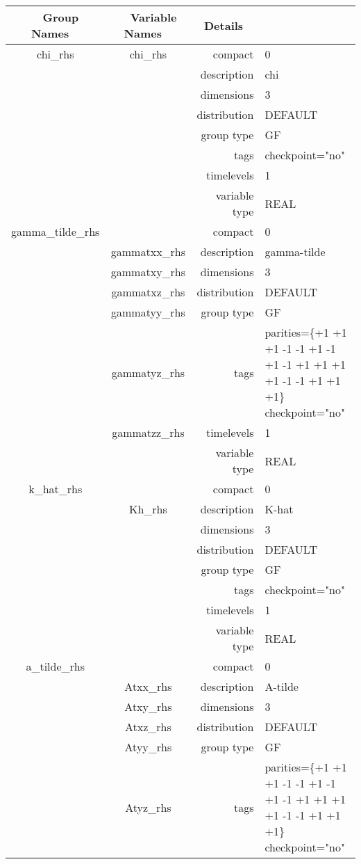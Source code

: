 \begin{tabular*}{150mm}{|c|c@{\extracolsep{\fill}}|rl|} \hline 
~ {\bf Group Names} ~ & ~ {\bf Variable Names} ~  &{\bf Details} ~ & ~ \\ 
\hline 
chi\_rhs & chi\_rhs & compact & 0 \\ 
 &  & description & chi \\ 
 &  & dimensions & 3 \\ 
 &  & distribution & DEFAULT \\ 
 &  & group type & GF \\ 
 &  & tags & checkpoint="no" \\ 
 &  & timelevels & 1 \\ 
 &  & variable type & REAL \\ 
\hline 
gamma\_tilde\_rhs &  & compact & 0 \\ 
 & gammatxx\_rhs & description & gamma-tilde \\ 
 & gammatxy\_rhs & dimensions & 3 \\ 
 & gammatxz\_rhs & distribution & DEFAULT \\ 
 & gammatyy\_rhs & group type & GF \\ 
 & gammatyz\_rhs & tags & parities=\{+1 +1 +1   -1 -1 +1   -1 +1 -1   +1 +1 +1   +1 -1 -1   +1 +1 +1\} checkpoint="no" \\ 
 & gammatzz\_rhs & timelevels & 1 \\ 
 &  & variable type & REAL \\ 
\hline 
k\_hat\_rhs &  & compact & 0 \\ 
 & Kh\_rhs & description & K-hat \\ 
 &  & dimensions & 3 \\ 
 &  & distribution & DEFAULT \\ 
 &  & group type & GF \\ 
 &  & tags & checkpoint="no" \\ 
 &  & timelevels & 1 \\ 
 &  & variable type & REAL \\ 
\hline 
a\_tilde\_rhs &  & compact & 0 \\ 
 & Atxx\_rhs & description & A-tilde \\ 
 & Atxy\_rhs & dimensions & 3 \\ 
 & Atxz\_rhs & distribution & DEFAULT \\ 
 & Atyy\_rhs & group type & GF \\ 
 & Atyz\_rhs & tags & parities=\{+1 +1 +1   -1 -1 +1   -1 +1 -1   +1 +1 +1   +1 -1 -1   +1 +1 +1\} checkpoint="no" \\ 

\end{tabular*}
